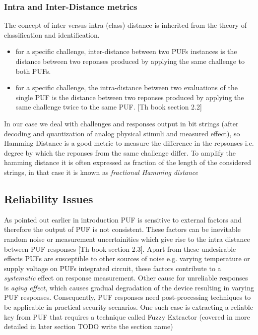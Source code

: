 \subsubsection{Intra and Inter-Distance metrics}
\label{intra_inter_section}
The concept of inter versus intra-(class) distance is inherited from the theory of classification and identification.
\begin{itemize}
	\item for a specific challenge, inter-distance between two PUFs instances is the distance between two reponses produced by applying the same challenge to both PUFs.
	\item for a specific challenge, the intra-distance between two evaluations of the single PUF is the distance between two reponses produced by applying the same challenge twice to the same PUF. [Th book section 2.2]
\end{itemize}

In our case we deal with challenges and responses output in bit strings (after decoding and quantization of analog physical stimuli and measured effect), so Hamming Distance is a good metric to measure the difference in the repsonses i.e. degree by which the reponses from the same challenge differ. To amplify the hamming distance it is often expressed as fraction of the length of the considered strings, in that case it is known as \emph{fractional Hamming distance}

\subsection{Reliability Issues}
As pointed out earlier in introduction PUF is sensitive to external factors and therefore the output of PUF is not consistent. These factors can be inevitable random noise or measurement uncertainities which give rise to the intra distance between PUF responses [Th book section 2.3]. Apart from these undesirable effects PUFs are susceptible to other sources of noise e.g. varying temperature or supply voltage on PUFs integrated circuit, these factors contribute to a \emph{systematic} effect on response measurement. Other cause for unreliable responses is \emph{aging effect}, which causes gradual degradation of the device resulting in varying PUF responses. Consequently, PUF responses need post-processing techniques to be applicable in practical security scenarios. One such case is extracting a reliable key from PUF that requires a technique called Fuzzy Extractor (covered in more detailed in later section TODO write the section name)


